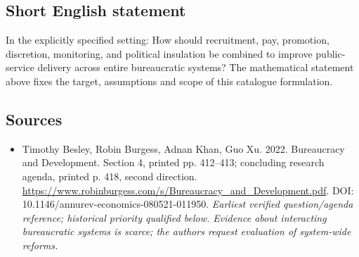 \documentclass[11pt]{article}
\begin{document}
\subsection{Short English statement}
In the explicitly specified setting: How should recruitment, pay, promotion, discretion, monitoring, and political insulation be combined to improve public-service delivery across entire bureaucratic systems? The mathematical statement above fixes the target, assumptions and scope of this catalogue formulation.

\subsection{Sources}
\begin{itemize}\raggedright
\item[\textnormal{[S1]}]\hypertarget{source:30007664:1}{} Timothy Besley, Robin Burgess, Adnan Khan, Guo Xu. 2022. Bureaucracy and Development. Section 4, printed pp. 412–413; concluding research agenda, printed p. 418, second direction.
\url{https://www.robinburgess.com/s/Bureaucracy_and_Development.pdf}.
DOI: 10.1146/annurev-economics-080521-011950.
{\small\textit{Earliest verified question/agenda reference; historical priority qualified below. Evidence about interacting bureaucratic systems is scarce; the authors request evaluation of system-wide reforms.}}
\end{itemize}
\end{document}
